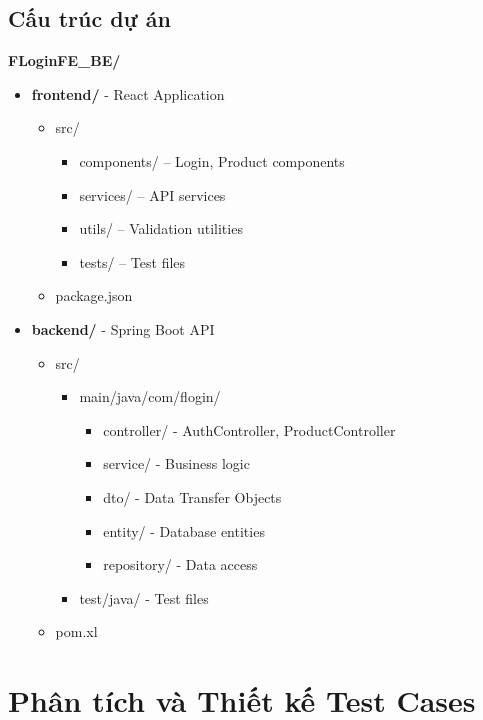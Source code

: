 \documentclass[a4paper,12pt]{article}
\begin{document}
\subsection{Cấu trúc dự án}

\textbf{FLoginFE\_BE/}
\begin{itemize}
    \item \textbf{frontend/} - React Application
    \begin{itemize}
        \item{src/}
        \begin{itemize}
            \item components/ -- Login, Product components
            \item services/ -- API services
            \item utils/ -- Validation utilities
            \item tests/ -- Test files
        \end{itemize}
        \item{package.json}
    \end{itemize}

    \item \textbf{backend/} - Spring Boot API
    \begin{itemize}
        \item{src/}
        \begin{itemize}
            \item  main/java/com/flogin/
            \begin{itemize}
                \item controller/ - AuthController, ProductController
                \item service/ - Business logic
                \item dto/ - Data Transfer Objects
                \item entity/ - Database entities
                \item repository/ - Data access
            \end{itemize}
            \item test/java/ - Test files
        \end{itemize}
        \item{pom.xl}
    \end{itemize}
\end{itemize}

\section{Phân tích và Thiết kế Test Cases}
\end{document}
